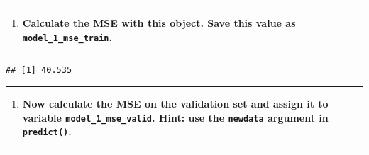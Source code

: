 \documentclass[
  12pt,
]{article}
\newenvironment{Shaded}{\begin{snugshade}}{\end{snugshade}}
\newcommand{\AttributeTok}[1]{\textcolor[rgb]{0.13,0.29,0.53}{#1}}
\newcommand{\CommentTok}[1]{\textcolor[rgb]{0.56,0.35,0.01}{\textit{#1}}}
\newcommand{\FunctionTok}[1]{\textcolor[rgb]{0.13,0.29,0.53}{\textbf{#1}}}
\newcommand{\NormalTok}[1]{#1}
\newcommand{\OtherTok}[1]{\textcolor[rgb]{0.56,0.35,0.01}{#1}}
\newcommand{\SpecialCharTok}[1]{\textcolor[rgb]{0.81,0.36,0.00}{\textbf{#1}}}
\providecommand{\tightlist}{%
  \setlength{\itemsep}{0pt}\setlength{\parskip}{0pt}}
\begin{document}
\begin{center}\rule{0.5\linewidth}{0.5pt}\end{center}

\begin{enumerate}
\def\labelenumi{\arabic{enumi}.}
\setcounter{enumi}{12}
\tightlist
\item
  \textbf{Calculate the MSE with this object. Save this value as
  \texttt{model\_1\_mse\_train}.}
\end{enumerate}

\begin{center}\rule{0.5\linewidth}{0.5pt}\end{center}

\begin{Shaded}
\end{Shaded}

\begin{verbatim}
## [1] 40.535
\end{verbatim}

\begin{center}\rule{0.5\linewidth}{0.5pt}\end{center}

\begin{enumerate}
\def\labelenumi{\arabic{enumi}.}
\setcounter{enumi}{13}
\tightlist
\item
  \textbf{Now calculate the MSE on the validation set and assign it to
  variable \texttt{model\_1\_mse\_valid}. Hint: use the \texttt{newdata}
  argument in \texttt{predict()}.}
\end{enumerate}

\begin{center}\rule{0.5\linewidth}{0.5pt}\end{center}
\end{document}
